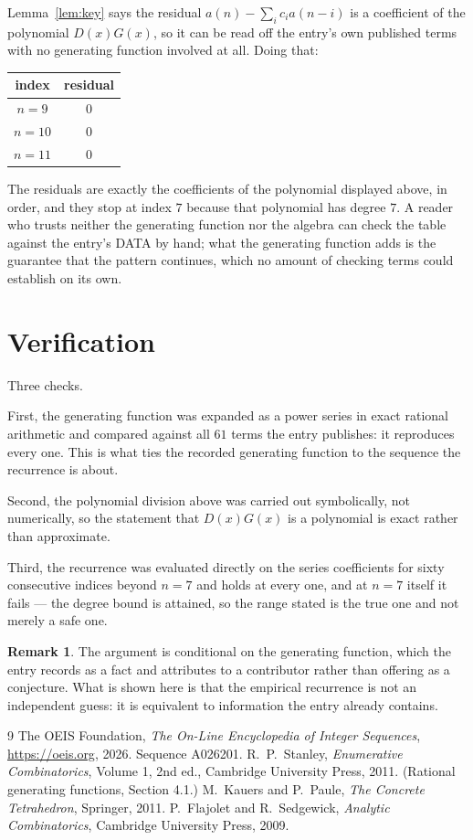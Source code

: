 \documentclass[11pt,a4paper]{article}
\theoremstyle{plain}
\theoremstyle{definition}
\newtheorem{remark}[theorem]{Remark}
\begin{document}
Lemma~\ref{lem:key} says the residual $a(n)-\sum_ic_ia(n-i)$ is a coefficient of the
polynomial $D(x)G(x)$, so it can be read off the entry's own published terms with no
generating function involved at all. Doing that:
\begin{center}
\begin{tabular}{cc}
index & residual \\ \hline
$n=9$ & $0$ \\
$n=10$ & $0$ \\
$n=11$ & $0$
\end{tabular}
\end{center}
The residuals are exactly the coefficients of the polynomial displayed above, in order, and
they stop at index $7$ because that polynomial has degree $7$. A reader who trusts
neither the generating function nor the algebra can check the table against the entry's DATA
by hand; what the generating function adds is the guarantee that the pattern continues, which
no amount of checking terms could establish on its own.

\section{Verification}

Three checks.

First, the generating function was expanded as a power series in exact rational arithmetic and
compared against all $61$ terms the entry publishes: it reproduces every one. This is
what ties the recorded generating function to the sequence the recurrence is about.

Second, the polynomial division above was carried out symbolically, not numerically, so the
statement that $D(x)G(x)$ is a polynomial is exact rather than approximate.

Third, the recurrence was evaluated directly on the series coefficients for sixty consecutive
indices beyond $n=7$ and holds at every one, and at $n=7$ itself it fails --- the
degree bound is attained, so the range stated is the true one and not merely a safe one.

\begin{remark}
The argument is conditional on the generating function, which the entry records as a fact and
attributes to a contributor rather than offering as a conjecture. What is shown here is that
the empirical recurrence is not an independent guess: it is equivalent to information the
entry already contains.
\end{remark}

\begin{thebibliography}{9}
 The OEIS Foundation, \emph{The On-Line Encyclopedia of Integer
Sequences}, \url{https://oeis.org}, 2026. Sequence A026201.
 R.~P.~Stanley, \emph{Enumerative Combinatorics}, Volume 1, 2nd ed.,
Cambridge University Press, 2011. (Rational generating functions, Section 4.1.)
 M.~Kauers and P.~Paule, \emph{The Concrete Tetrahedron}, Springer, 2011.
 P.~Flajolet and R.~Sedgewick, \emph{Analytic Combinatorics}, Cambridge
University Press, 2009.
\end{thebibliography}
\end{document}
